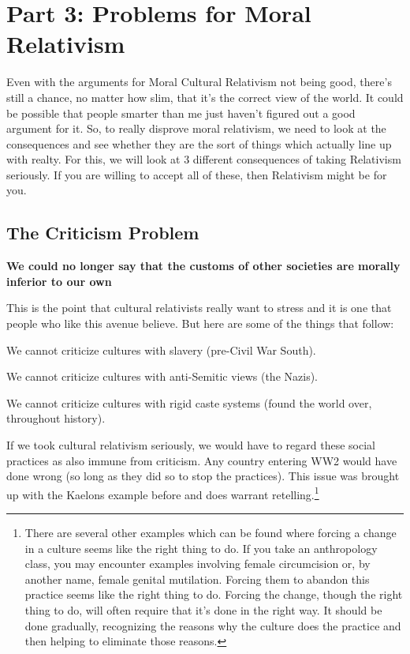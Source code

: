 \chapter{Part 3: Problems for Moral Relativism}

Even with the arguments for Moral Cultural Relativism not being good, there's still a chance, no matter how slim, that it's the correct view of the world. It could be possible that people smarter than me just haven't figured out a good argument for it. So, to really disprove moral relativism, we need to look at the consequences and see whether they are the sort of things which actually line up with realty. For this, we will look at 3 different consequences of taking Relativism seriously. If you are willing to accept all of these, then Relativism might be for you.

\section{The Criticism Problem}

\begin{center}
\textbf{We could no longer say that the customs of other societies are morally inferior to our own}
\end{center}

This is the point that cultural relativists really want to stress and it is one that people who like this avenue believe. But here are some of the things that follow:
\begin{earg}
    \item[]We cannot criticize cultures with slavery (pre-Civil War South).
    \item[]We cannot criticize cultures with anti-Semitic views (the Nazis).
    \item[]We cannot criticize cultures with rigid caste systems (found the world over, throughout history). 
\end{earg}
If we took cultural relativism seriously, we would have to regard these social practices as also immune from criticism. Any country entering WW2 would have done wrong (so long as they did so to stop the practices). This issue was brought up with the Kaelons example before and does warrant retelling.\footnote{There are several other examples which can be found where forcing a change in a culture seems like the right thing to do. If you take an anthropology class, you may encounter examples involving female circumcision or, by another name, female genital mutilation. Forcing them to abandon this practice seems like the right thing to do. Forcing the change, though the right thing to do, will often require that it's done in the right way. It should be done gradually, recognizing the reasons why the culture does the practice and then helping to eliminate those reasons.}

